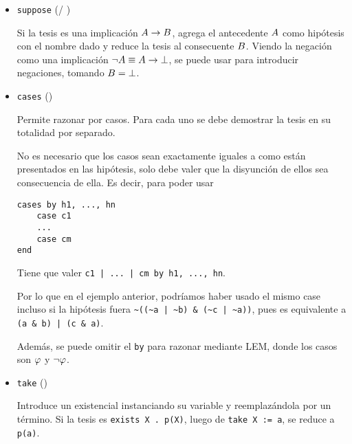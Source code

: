 \begin{itemize}
    \item \lstinline{suppose} ( / )
    
    Si la tesis es una implicación $A \to B$, agrega el antecedente
    $A$ como hipótesis con el nombre dado y reduce la tesis al consecuente
    $B$. Viendo la negación como una implicación $\neg A \equiv
    A \to \bot$, se puede usar para introducir negaciones, tomando
    $B = \bot$.

    \begin{multicols}{2}
        
        \vfill\null
        \columnbreak
            
    \end{multicols}
    \item \lstinline{cases} ()
    
    Permite razonar por casos. Para cada uno se debe demostrar la tesis en su
    totalidad por separado.

    

    No es necesario que los casos sean exactamente iguales a como están
    presentados en las hipótesis, solo debe valer que la disyunción de ellos sea
    consecuencia de ella. Es decir, para poder usar

    \begin{lstlisting}[numbers=none]
cases by h1, ..., hn
    case c1
    ...
    case cm
end
    \end{lstlisting}

    Tiene que valer \lstinline{c1 | ... | cm by h1, ..., hn}.
    
    Por lo que en el ejemplo anterior, podríamos haber usado el mismo case
    incluso si la hipótesis fuera \lstinline{~((~a | ~b) & (~c | ~a))}, pues es
    equivalente a \lstinline{(a & b) | (c & a)}.

    Además, se puede omitir el \lstinline{by} para razonar mediante LEM, donde
    los casos son $\varphi$ y $\neg \varphi$.

    \item \lstinline{take} ()
    
    Introduce un existencial instanciando su variable y reemplazándola por un
    término. Si la tesis es \lstinline{exists X . p(X)}, luego de
    \lstinline{take X := a}, se reduce a \lstinline{p(a)}.


\end{itemize}
